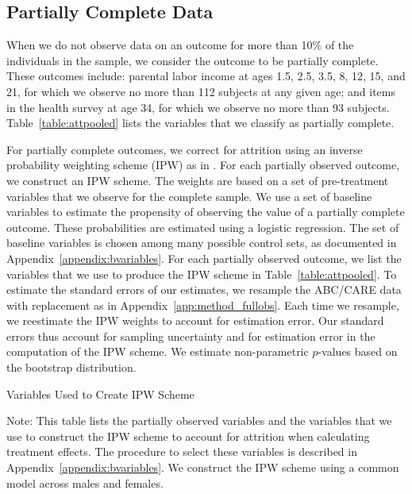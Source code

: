 \subsection{Partially Complete Data}
\label{app:method_partialobs}

When we do not observe data on an outcome for more than 10\% of the individuals in the sample, we consider the outcome to be partially complete. These outcomes include: parental labor income at ages 1.5, 2.5, 3.5, 8, 12, 15, and 21, for which we observe no more than 112 subjects at any given age; and items in the health survey at age 34, for which we observe no more than 93 subjects. Table~\ref{table:attpooled} lists the variables that we classify as partially complete.

\noindent For partially complete outcomes, we correct for attrition using an inverse probability weighting scheme (IPW) as in  \citet{Horvitz_Thompson_1952_JASA}. For each partially observed outcome, we construct an IPW scheme. The weights are based on a set of pre-treatment variables that we observe for the complete sample. We use a set of baseline variables to estimate the propensity of observing the value of a partially complete outcome.  These probabilities are estimated using a logistic regression. The set of baseline variables is chosen among many possible control sets,  as documented in Appendix~\ref{appendix:bvariables}. For each partially observed outcome, we list the variables that we use to produce the IPW scheme in Table~\ref{table:attpooled}. To estimate the standard errors of our estimates, we resample the ABC/CARE data with replacement as in Appendix~\ref{app:method_fullobs}. Each time we resample, we reestimate the IPW weights to account for estimation error. Our standard errors thus account for sampling uncertainty and for estimation error in the computation of the IPW scheme. We estimate non-parametric $p$-values based on the bootstrap distribution.

\begin{table}
\begin{threeparttable}
\caption{Variables Used to Create IPW Scheme}
\label{table:attpooled}
\centering

\begin{tablenotes}
\footnotesize
\item Note: This table lists the partially observed variables and the variables that we use to construct the IPW scheme to account for attrition when calculating treatment effects. The procedure to select these variables is described in Appendix~\ref{appendix:bvariables}. We construct the IPW scheme using a common model across males and females.
\end{tablenotes}
\end{threeparttable}
\end{table}
\restoregeometry
\doublespacing

